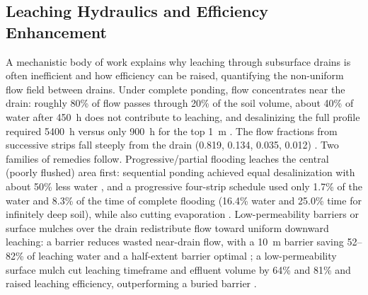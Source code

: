 \documentclass[11pt]{article}
\begin{document}
\subsection{Leaching Hydraulics and Efficiency Enhancement}

A mechanistic body of work explains why leaching through subsurface drains is often inefficient and how efficiency can be raised, quantifying the non-uniform flow field between drains. Under complete ponding, flow concentrates near the drain: roughly 80\% of flow passes through 20\% of the soil volume, about 40\% of water after 450~h does not contribute to leaching, and desalinizing the full profile required 5400~h versus only 900~h for the top 1~m \parencite{RAO1991}. The flow fractions from successive strips fall steeply from the drain (0.819, 0.134, 0.035, 0.012) \parencite{Youngs2000}. Two families of remedies follow. Progressive/partial flooding leaches the central (poorly flushed) area first: sequential ponding achieved equal desalinization with about 50\% less water \parencite{RAO1991}, and a progressive four-strip schedule used only 1.7\% of the water and 8.3\% of the time of complete flooding (16.4\% water and 25.0\% time for infinitely deep soil), while also cutting evaporation \parencite{Youngs2000}. Low-permeability barriers or surface mulches over the drain redistribute flow toward uniform downward leaching: a barrier reduces wasted near-drain flow, with a 10~m barrier saving 52--82\% of leaching water and a half-extent barrier optimal \parencite{Yu2018}; a low-permeability surface mulch cut leaching timeframe and effluent volume by 64\% and 81\% and raised leaching efficiency, outperforming a buried barrier \parencite{Zhang2022}.
\end{document}
